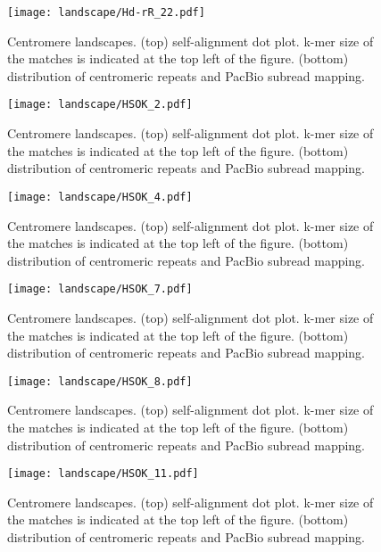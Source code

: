 \addtocounter{figure}{-1}
\begin{figure}[p]
  \centering
  \texttt{[image: landscape/Hd-rR\_22.pdf]}
  \caption{
    Centromere landscapes. (top) self-alignment dot plot. k-mer size of the matches is indicated at the top left of the figure. (bottom) distribution of centromeric repeats and PacBio subread mapping.
  }
  \label{centromere_landscape}
\end{figure}

\addtocounter{figure}{-1}
\begin{figure}[p]
  \centering
  \texttt{[image: landscape/HSOK\_2.pdf]}
  \caption{
    Centromere landscapes. (top) self-alignment dot plot. k-mer size of the matches is indicated at the top left of the figure. (bottom) distribution of centromeric repeats and PacBio subread mapping.
  }
  \label{centromere_landscape}
\end{figure}

\addtocounter{figure}{-1}
\begin{figure}[p]
  \centering
  \texttt{[image: landscape/HSOK\_4.pdf]}
  \caption{
    Centromere landscapes. (top) self-alignment dot plot. k-mer size of the matches is indicated at the top left of the figure. (bottom) distribution of centromeric repeats and PacBio subread mapping.
  }
  \label{centromere_landscape}
\end{figure}

\addtocounter{figure}{-1}
\begin{figure}[p]
  \centering
  \texttt{[image: landscape/HSOK\_7.pdf]}
  \caption{
    Centromere landscapes. (top) self-alignment dot plot. k-mer size of the matches is indicated at the top left of the figure. (bottom) distribution of centromeric repeats and PacBio subread mapping.
  }
  \label{centromere_landscape}
\end{figure}

\addtocounter{figure}{-1}
\begin{figure}[p]
  \centering
  \texttt{[image: landscape/HSOK\_8.pdf]}
  \caption{
    Centromere landscapes. (top) self-alignment dot plot. k-mer size of the matches is indicated at the top left of the figure. (bottom) distribution of centromeric repeats and PacBio subread mapping.
  }
  \label{centromere_landscape}
\end{figure}

\addtocounter{figure}{-1}
\begin{figure}[p]
  \centering
  \texttt{[image: landscape/HSOK\_11.pdf]}
  \caption{
    Centromere landscapes. (top) self-alignment dot plot. k-mer size of the matches is indicated at the top left of the figure. (bottom) distribution of centromeric repeats and PacBio subread mapping.
  }
  \label{centromere_landscape}
\end{figure}

